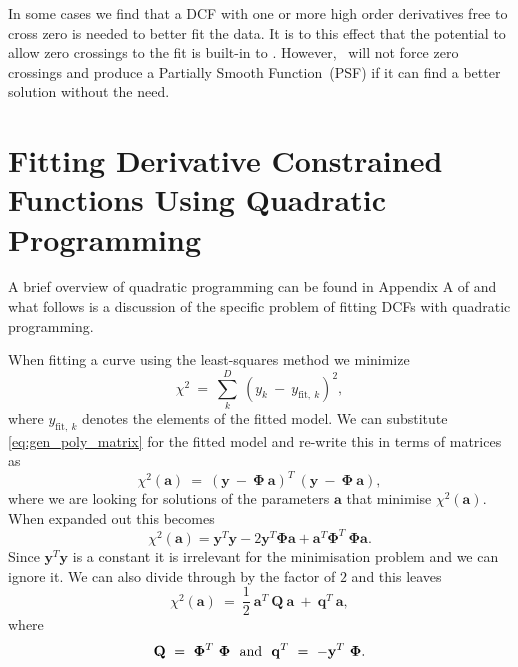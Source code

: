 In some cases we find that a DCF with one or more high order derivatives free to cross zero is needed to better fit the data. It is to this effect that the potential to allow zero crossings to the fit is built-in to \maxsmooth. However, \maxsmooth~will not force zero crossings and produce a Partially Smooth Function~(PSF) if it can find a better solution without the need.

\section{Fitting Derivative Constrained Functions Using Quadratic Programming}
\label{sec:qp}

A brief overview of quadratic programming can be found in Appendix A of \cite{Bevins_maxsmooth_2021} and what follows is a discussion of the specific problem of fitting DCFs with quadratic programming.

When fitting a curve using the least-squares method we minimize
\begin{equation}
    \chi^2~=~\sum_k^D~(y_{k}~-~y_{\mathrm{fit,}~k})^2,
\end{equation}
where $y_{\mathrm{fit},~k}$ denotes the elements of the fitted model. We can substitute \cref{eq:gen_poly_matrix} for the fitted model and re-write this in terms of matrices as
\begin{equation}
    \chi^2(\mathbf{a})~=~(\mathbf{y}~-~\mathbf{\Phi}~\mathbf{a})^T~(\mathbf{y}~-~\mathbf{\Phi}~\mathbf{a}),
\end{equation}
where we are looking for solutions of the parameters $\mathbf{a}$ that minimise $\chi^2(\mathbf{a})$. When expanded out this becomes
\begin{equation}
    \chi^2(\mathbf{a}) = \mathbf{y}^T\mathbf{y} - 2 \mathbf{y}^T \mathbf{\Phi} \mathbf{a} + \mathbf{a}^T \mathbf{\Phi}^T~\mathbf{\Phi} \mathbf{a}.
\end{equation}
Since $\mathbf{y}^T\mathbf{y}$ is a constant it is irrelevant for the minimisation problem and we can ignore it. We can also divide through by the factor of $2$ and this leaves
\begin{equation}
    \chi^2(\mathbf{a})~=~\frac{1}{2}~\mathbf{a}^T~\mathbf{Q}~\mathbf{a}~+~\mathbf{q}^T~\mathbf{a},
    \label{eq:chi}
\end{equation}
where
\begin{equation}
    \mathbf{Q}~=~ \mathbf{\Phi}^T~\mathbf{\Phi}~~\textnormal{and}~~ \mathbf{q}^T~=~-\mathbf{y}^T~\mathbf{\Phi}.
\end{equation}

